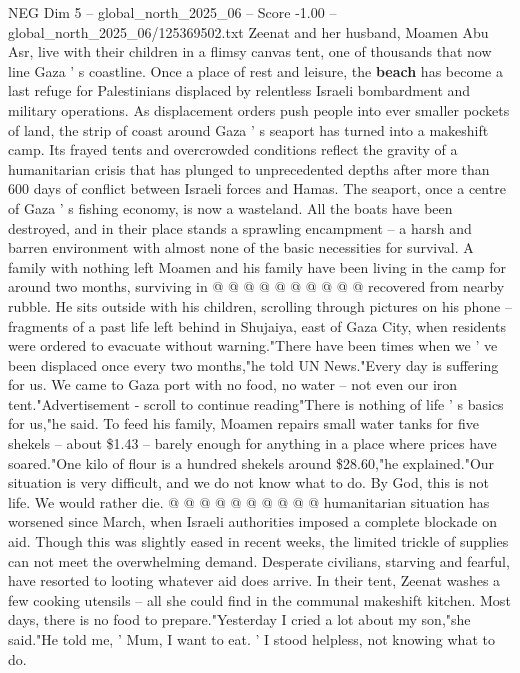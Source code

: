 \begin{textsample}{NEG Dim 5 – global\_north\_2025\_06 – Score -1.00 – global\_north\_2025\_06/125369502.txt}  \label{ex:f5_neg_372}
Zeenat and her husband, Moamen Abu Asr, live with their children in a flimsy canvas tent, one of thousands that now line Gaza ' s coastline.
Once a place of rest and leisure, the \textbf{beach} has become a last refuge for Palestinians displaced by relentless Israeli bombardment and military operations.
As displacement orders push people into ever smaller pockets of land, the strip of coast around Gaza ' s seaport has turned into a makeshift camp.
Its frayed tents and overcrowded conditions reflect the gravity of a humanitarian crisis that has plunged to unprecedented depths after more than 600 days of conflict between Israeli forces and Hamas.
The seaport, once a centre of Gaza ' s fishing economy, is now a wasteland.
All the boats have been destroyed, and in their place stands a sprawling encampment -- a harsh and barren environment with almost none of the basic necessities for survival.
A family with nothing left Moamen and his family have been living in the camp for around two months, surviving in @ @ @ @ @ @ @ @ @ @ recovered from nearby rubble.
He sits outside with his children, scrolling through pictures on his phone -- fragments of a past life left behind in Shujaiya, east of Gaza City, when residents were ordered to evacuate without warning."There have been times when we ' ve been displaced once every two months,"he told UN News."Every day is suffering for us.
We came to Gaza port with no food, no water -- not even our iron tent."Advertisement - scroll to continue reading"There is nothing of life ' s basics for us,"he said.
To feed his family, Moamen repairs small water tanks for five shekels -- about \$1.43 -- barely enough for anything in a place where prices have soared."One kilo of flour is a hundred shekels around \$28.60,"he explained."Our situation is very difficult, and we do not know what to do.
By God, this is not life.
We would rather die. @ @ @ @ @ @ @ @ @ @ humanitarian situation has worsened since March, when Israeli authorities imposed a complete blockade on aid.
Though this was slightly eased in recent weeks, the limited trickle of supplies can not meet the overwhelming demand.
Desperate civilians, starving and fearful, have resorted to looting whatever aid does arrive.
In their tent, Zeenat washes a few cooking utensils -- all she could find in the communal makeshift kitchen.
Most days, there is no food to prepare."Yesterday I cried a lot about my son,"she said."He told me, ' Mum, I want to eat. ' I stood helpless, not knowing what to do.

\end{textsample}
